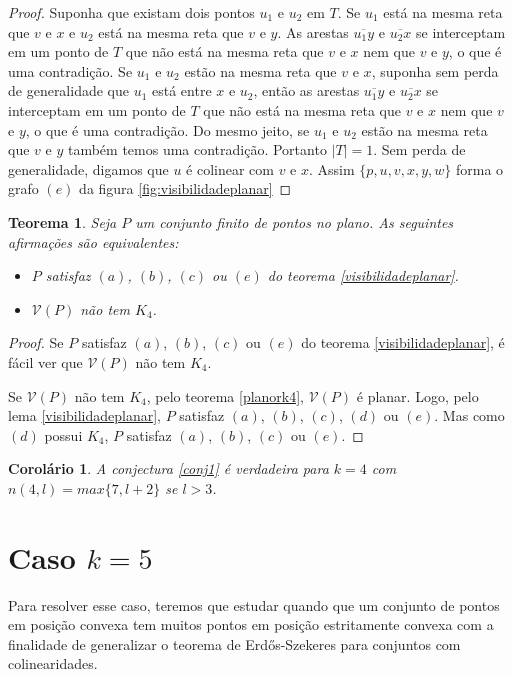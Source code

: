 \documentclass[a4paper]{book}
\newtheorem{teorema}{Teorema}
\newtheorem{corolario}{Corolário}[teorema]
\begin{document}
\begin{proof}
    Suponha que existam dois pontos $u_1$ e $u_2$ em $T$. Se $u_1$ está na mesma reta que $v$ e $x$ e $u_2$ está na mesma reta que $v$ e $y$. As arestas $\overline{u_1y}$ e $\overline{u_2x}$ se interceptam em um ponto de $T$ que não está na mesma reta que $v$ e $x$ nem que $v$ e $y$, o que é uma contradição. Se $u_1$ e $u_2$ estão na mesma reta que $v$ e $x$, suponha sem perda de generalidade que $u_1$ está entre $x$ e $u_2$, então as arestas $\overline{u_1y}$ e $\overline{u_2x}$ se interceptam em um ponto de $T$ que não está na mesma reta que $v$ e $x$ nem que $v$ e $y$, o que é uma contradição. Do mesmo jeito, se $u_1$ e $u_2$ estão na mesma reta que $v$ e $y$ também temos uma contradição. Portanto $|T|=1$. Sem perda de generalidade, digamos que $u$ é colinear com $v$ e $x$. Assim $\{p,u,v,x,y,w\}$ forma o grafo $(e)$ da figura \ref{fig:visibilidadeplanar}
\end{proof}
\begin{teorema}
    Seja $P$ um conjunto finito de pontos no plano. As seguintes afirmações são equivalentes:
    \begin{itemize}
        \item
            $P$ satisfaz $(a)$, $(b)$, $(c)$ ou $(e)$ do teorema \ref{visibilidadeplanar}.
        \item
            $\mathcal V(P)$ não tem $K_4$.
    \end{itemize}
\end{teorema}
\begin{proof}
    Se $P$ satisfaz $(a)$, $(b)$, $(c)$ ou $(e)$ do teorema \ref{visibilidadeplanar}, é fácil ver que $\mathcal V(P)$ não tem $K_4$.

    Se $\mathcal V(P)$ não tem $K_4$, pelo teorema \ref{planork4}, $\mathcal V(P)$ é planar. Logo, pelo lema \ref{visibilidadeplanar}, $P$ satisfaz $(a)$, $(b)$, $(c)$, $(d)$ ou $(e)$. Mas como $(d)$ possui $K_4$, $P$ satisfaz $(a)$, $(b)$, $(c)$ ou $(e)$.
\end{proof}

\begin{corolario}
    A conjectura \ref{conj1} é verdadeira para $k=4$ com $n(4,l)=max\{7,l+2\}$ se $l>3$.
\end{corolario}

\section{Caso $k=5$}
\cite{pentagon}
\cite{pentagon2}
Para resolver esse caso, teremos que estudar quando que um conjunto de pontos em posição convexa tem muitos pontos em posição estritamente convexa com a finalidade de generalizar o teorema de Erd\H os-Szekeres para conjuntos com colinearidades.
\end{document}

